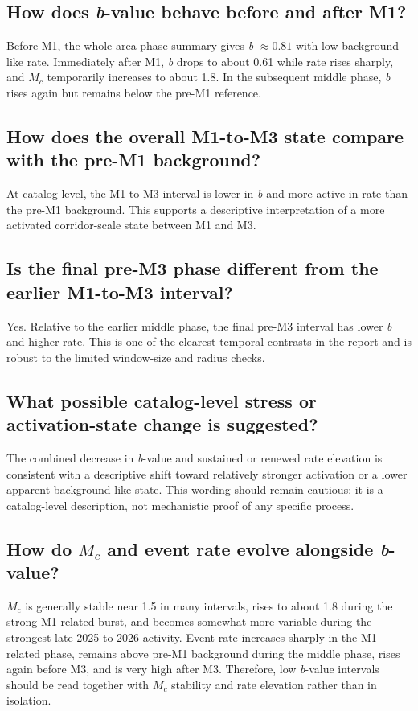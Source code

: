 \documentclass[11pt]{article}
\begin{document}
\subsection*{How does \textit{b}-value behave before and after M1?}
Before M1, the whole-area phase summary gives \textit{b} $\approx 0.81$ with low background-like rate. Immediately after M1, \textit{b} drops to about 0.61 while rate rises sharply, and $M_c$ temporarily increases to about 1.8. In the subsequent middle phase, \textit{b} rises again but remains below the pre-M1 reference.

\subsection*{How does the overall M1-to-M3 state compare with the pre-M1 background?}
At catalog level, the M1-to-M3 interval is lower in \textit{b} and more active in rate than the pre-M1 background. This supports a descriptive interpretation of a more activated corridor-scale state between M1 and M3.

\subsection*{Is the final pre-M3 phase different from the earlier M1-to-M3 interval?}
Yes. Relative to the earlier middle phase, the final pre-M3 interval has lower \textit{b} and higher rate. This is one of the clearest temporal contrasts in the report and is robust to the limited window-size and radius checks.

\subsection*{What possible catalog-level stress or activation-state change is suggested?}
The combined decrease in \textit{b}-value and sustained or renewed rate elevation is consistent with a descriptive shift toward relatively stronger activation or a lower apparent background-like state. This wording should remain cautious: it is a catalog-level description, not mechanistic proof of any specific process.

\subsection*{How do $M_c$ and event rate evolve alongside \textit{b}-value?}
$M_c$ is generally stable near 1.5 in many intervals, rises to about 1.8 during the strong M1-related burst, and becomes somewhat more variable during the strongest late-2025 to 2026 activity. Event rate increases sharply in the M1-related phase, remains above pre-M1 background during the middle phase, rises again before M3, and is very high after M3. Therefore, low \textit{b}-value intervals should be read together with $M_c$ stability and rate elevation rather than in isolation.
\end{document}
